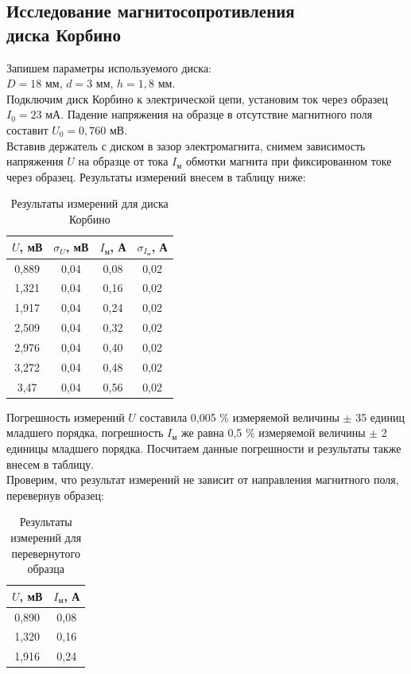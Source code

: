 \documentclass[a4paper,12pt]{extarticle}
\begin{document}
\subsection*{Исследование магнитосопротивления \\ диска Корбино}
Запишем параметры используемого диска:\\
$D = 18$ мм, $d = 3$ мм, $h = 1,8$ мм.\\
Подключим диск Корбино к электрической цепи, установим ток через образец $I_0 = 23$ мА. Падение напряжения на образце в отсутствие магнитного поля составит $U_0 = 0,760$ мВ.\\
Вставив держатель с диском в зазор электромагнита, снимем зависимость напряжения $U$ на образце от тока $I_{\text{м}}$ обмотки магнита при фиксированном токе через образец. Результаты измерений внесем в таблицу ниже:
\begin{table}[H]
\centering
\begin{tabular}{|c|c|c|c|}
\hline
$U$, мВ & $\sigma_{U}$, мВ & $I_{\text{м}}$, А & $\sigma_{I_{\text{м}}}$, А \\ \hline
0,889 & 0,04 & 0,08 & 0,02 \\ \hline
1,321 & 0,04 & 0,16 & 0,02 \\ \hline
1,917 & 0,04 & 0,24 & 0,02 \\ \hline
2,509 & 0,04 & 0,32 & 0,02 \\ \hline
2,976 & 0,04 & 0,40 & 0,02 \\ \hline
3,272 & 0,04 & 0,48 & 0,02 \\ \hline
3,47  & 0,04 & 0,56 & 0,02 \\ \hline
\end{tabular}
\caption{Результаты измерений для диска Корбино}
\end{table}
\noindent Погрешность измерений $U$ составила 0,005 \% измеряемой величины $\pm$ 35 единиц младшего порядка, погрешность $I_{\text{м}}$ же равна 0,5 \% измеряемой величины $\pm$ 2 единицы младшего порядка. Посчитаем данные погрешности и результаты также внесем в таблицу.\\
Проверим, что результат измерений не зависит от направления магнитного поля, перевернув образец:
\begin{table}[H]
\centering
\begin{tabular}{|c|c|}
\hline
$U$, мВ & $I_{\text{м}}$, А \\ \hline
0,890 & 0,08 \\ \hline
1,320 & 0,16 \\ \hline
1,916 & 0,24 \\ \hline
\end{tabular}
\caption{Результаты измерений для перевернутого образца}
\end{table}
\end{document}
